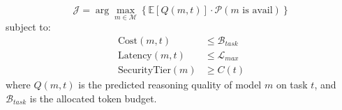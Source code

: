 \begin{equation}
\label{eq:optimization}
\mathcal{J} = \arg \max_{m \in \mathcal{M}} \left\{ \mathbb{E}[Q(m, t)] \cdot \mathcal{P}(m \text{ is avail}) \right\}
\end{equation}
subject to:
\begin{equation*}
\begin{aligned}
\text{Cost}(m, t) &\leq \mathcal{B}_{task} \\
\text{Latency}(m, t) &\leq \mathcal{L}_{max} \\
\text{SecurityTier}(m) &\geq C(t)
\end{aligned}
\end{equation*}
where $Q(m, t)$ is the predicted reasoning quality of model $m$ on task $t$, and $\mathcal{B}_{task}$ is the allocated token budget.
